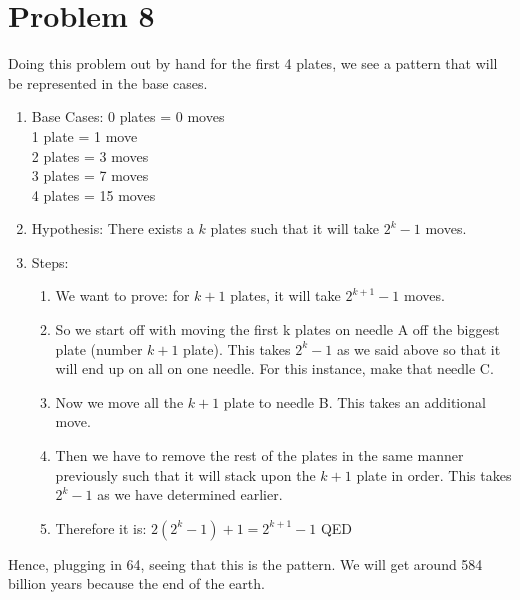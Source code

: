 \documentclass[11pt,letterpaper]{article}
\begin{document}
\section*{Problem 8}
Doing this problem out by hand for the first 4 plates, we see a pattern that will be represented in the base cases.
\begin{enumerate}
	\item[] Base Cases: 0 plates = 0 moves
	\\ 1 plate = 1 move
	\\ 2 plates = 3 moves
	\\ 3 plates = 7 moves
	\\ 4 plates = 15 moves
	\item[] Hypothesis: There exists a $k$ plates such that it will take $2^k - 1$ moves.
	\item[] Steps:
	\begin{enumerate}
		\item We want to prove: for $k+1$ plates, it will take $2^{k+1} - 1$ moves.
		\item So we start off with moving the first k plates on needle A off the biggest plate (number $k+1$ plate). This takes $2^k - 1$ as we said above so that it will end up on all on one needle. For this instance, make that needle C.
		\item Now we move all the $k+1$ plate to needle B. This takes an additional move.
		\item Then we have to remove the rest of the plates in the same manner previously such that it will stack upon the $k+1$ plate in order. This takes $2^k - 1$ as we have determined earlier. 
		\item Therefore it is: $2(2^k - 1) + 1 = 2^{k+1} - 1$ QED
	\end{enumerate}
\end{enumerate}
Hence, plugging in 64, seeing that this is the pattern. We will get around 584 billion years because the end of the earth.
\end{document}
